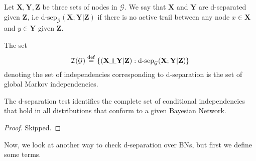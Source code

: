 \begin{defn}[d-separation]
Let $\mathbf X, \mathbf Y, \mathbf Z$ be three sets of nodes in $\mathcal G$. We say that $\mathbf X$ and $\mathbf Y$ are d-separated given $\mathbf Z$, i.e $\text{d-sep}_\mathcal{G}(\mathbf X; \mathbf Y|\mathbf Z)$ if there is no active trail between any node $x \in \mathbf X$ and $y \in \mathbf Y$ given $\mathbf Z$.
\end{defn}
\begin{defn}
The set 
\begin{equation}
\mathcal{I(G)} \overset{\mathrm{def}}{=} \{(\mathbf X \ind \mathbf Y | \mathbf Z): \text{d-sep}_\mathcal{G}(\mathbf X; \mathbf Y | \mathbf Z)\}
\end{equation}
denoting the set of independencies corresponding to d-separation is the set of global Markov independencies. 
\end{defn}
\begin{thm}\label{thm:global-markov-ind}
The d-separation test identifies the complete set of conditional independencies that hold in all distributions that conform to a given Bayesian Network.
\end{thm}
\begin{proof}
Skipped.
\end{proof}
Now, we look at another way to check d-separation over BNs, but first we define some terms.
